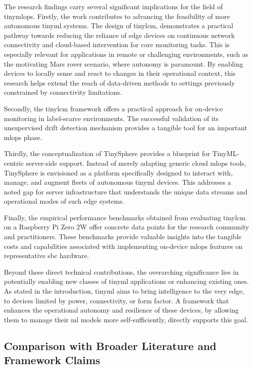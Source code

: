 The research findings carry several significant implications for the field of \gls{tinymlops}.
Firstly, the work contributes to advancing the feasibility of more autonomous \gls{tinyml} systems. The design of \gls{tinylcm}, demonstrates a practical pathway towards reducing the reliance of edge devices on continuous network connectivity and cloud-based intervention for core monitoring tasks. This is especially relevant for applications in remote or challenging environments, such as the motivating Mars rover scenario, where autonomy is paramount. By enabling devices to locally sense and react to changes in their operational context, this research helps extend the reach of data-driven methods to settings previously constrained by connectivity limitations.

Secondly, the \gls{tinylcm} framework offers a practical approach for on-device monitoring in label-scarce environments. The successful validation of its unsupervised drift detection mechanism provides a tangible tool for an important \gls{mlops} phase.

Thirdly, the conceptualization of TinySphere provides a blueprint for TinyML-centric server-side support. Instead of merely adapting generic cloud \gls{mlops} tools, TinySphere is envisioned as a platform specifically designed to interact with, manage, and augment fleets of autonomous \gls{tinyml} devices. This addresses a noted gap for server infrastructure that understands the unique data streams and operational modes of such edge systems.

Finally, the empirical performance benchmarks obtained from evaluating \gls{tinylcm} on a Raspberry Pi Zero 2W offer concrete data points for the research community and practitioners. These benchmarks provide valuable insights into the tangible costs and capabilities associated with implementing on-device \gls{mlops} features on representative \gls{sbc} hardware.

Beyond these direct technical contributions, the overarching significance lies in potentially enabling new classes of \gls{tinyml} applications or enhancing existing ones. As stated in the introduction, \gls{tinyml} aims to bring intelligence to the very edge, to devices limited by power, connectivity, or form factor. A framework that enhances the operational autonomy and resilience of these devices, by allowing them to manage their \gls{ml} models more self-sufficiently, directly supports this goal.

\subsection{Comparison with Broader Literature and Framework Claims}
\label{ssec:comparison_literature_claims}


